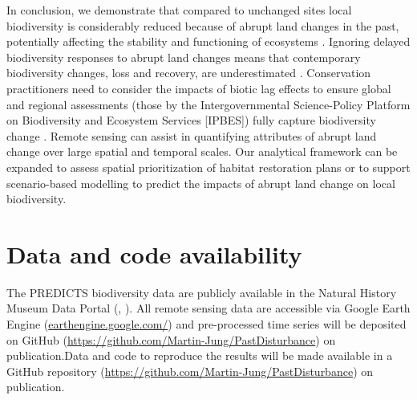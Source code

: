 In conclusion, we demonstrate that compared to unchanged sites local biodiversity is considerably reduced because of abrupt land changes in the past, potentially affecting the stability and functioning of ecosystems \citep{Hautier2015}. Ignoring delayed biodiversity responses to abrupt land changes means that contemporary biodiversity changes, loss and recovery, are underestimated \citep{Kuussaari2009,Essl2015}. Conservation practitioners need to consider the impacts of biotic lag effects to ensure global and regional assessments (\eg those by the Intergovernmental Science-Policy Platform on Biodiversity and Ecosystem Services [IPBES]) fully capture biodiversity change \citep{Essl2015}. Remote sensing can assist in quantifying attributes of abrupt land change over large spatial and temporal scales. Our analytical framework can be expanded to assess spatial prioritization of habitat restoration plans or to support scenario-based modelling \citep{Ewers2009} to predict the impacts of abrupt land change on local biodiversity.

\section{Data and code availability}
\label{C03_05}
The PREDICTS biodiversity data are publicly available in the Natural History Museum Data Portal (, \cite{Hudson2016}). All remote sensing data are accessible via Google Earth Engine (\href{earthengine.google.com/}{earthengine.google.com/}) \citep{Gorelick2017} and pre-processed time series will be deposited on GitHub (\href{https://github.com/Martin-Jung/PastDisturbance}{https://github.com/Martin-Jung/PastDisturbance}) on publication.Data and code to reproduce the results will be made available in a GitHub repository (\href{https://github.com/Martin-Jung/PastDisturbance}{https://github.com/Martin-Jung/PastDisturbance}) on publication.

\clearpage
%

%  
